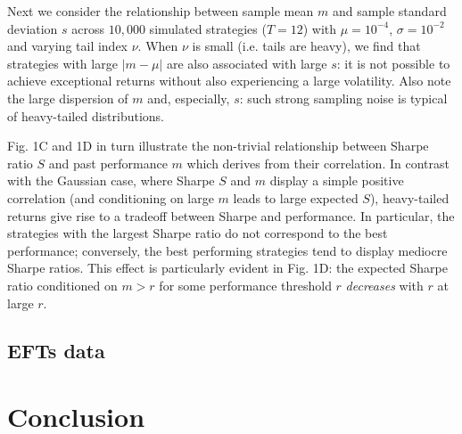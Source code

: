 \documentclass[
reprint,
amsmath,amssymb,
aps,
]{revtex4-2}
\begin{document}
Next we consider the relationship between sample mean $m$ and sample standard deviation $s$ across $10,000$ simulated strategies ($T = 12$) with $\mu = 10^{-4}$, $\sigma = 10^{-2}$ and varying tail index $\nu$. When $\nu$ is small (i.e. tails are heavy), we find that strategies with large $\vert m - \mu\vert$ are also associated with large $s$: it is not possible to achieve exceptional returns without also experiencing a large volatility. Also note the large dispersion of $m$ and, especially, $s$: such strong sampling noise is typical of heavy-tailed distributions. 

Fig. 1C and 1D in turn illustrate the non-trivial relationship between Sharpe ratio $S$ and past performance $m$ which derives from their correlation. In contrast with the Gaussian case, where Sharpe $S$ and $m$ display a simple positive correlation (and conditioning on large $m$ leads to large expected $S$), heavy-tailed returns give rise to a tradeoff between Sharpe and performance. In particular, the strategies with the largest Sharpe ratio do not correspond to the best performance; conversely, the best performing strategies tend to display mediocre Sharpe ratios. This effect is particularly evident in Fig. 1D: the expected Sharpe ratio conditioned on $m>r$ for some performance threshold $r$ \emph{decreases} with $r$ at large $r$. 

\subsection{EFTs data}

\section{Conclusion}


\end{document}
